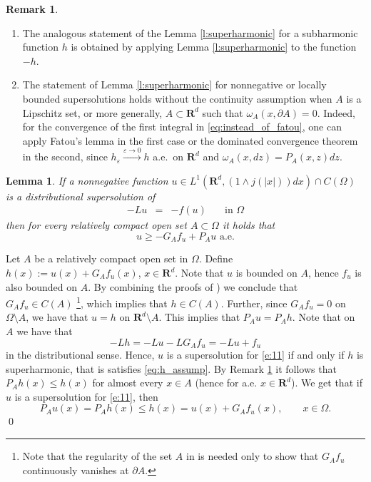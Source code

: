 \documentclass[a4paper,12pt,draft]{article}
\theoremstyle{plain}
\newtheorem{lemma}[thm]{Lemma}
\theoremstyle{definition}
\newtheorem{remark}[thm]{Remark}
\numberwithin{equation}{section}
\newcommand\R{\mathbf{R}}
\renewcommand{\le}{\leqslant}
\renewcommand{\ge}{\geqslant}
\newcommand{\1}{1}
\begin{document}
\begin{remark}\label{r:superharmonic}
\begin{enumerate}
    \item The analogous statement of the Lemma \ref{l:superharmonic} for a subharmonic function $h$ is obtained by applying Lemma \ref{l:superharmonic} to the function $-h$.
    \item The statement of Lemma \ref{l:superharmonic} for nonnegative or locally bounded supersolutions holds without the continuity assumption when $A$ is a Lipschitz set, or more generally, $A\subset\R^d$ such that $\omega_A(x,\partial A)=0$. Indeed, for the convergence of the first integral in \eqref{eq:instead_of_fatou}, one can apply Fatou's lemma in the first case or the dominated convergence theorem in the second, since $h_\varepsilon\xrightarrow{\varepsilon\to 0} h$ a.e.~on $\R^d$ and $\omega_A(x,dz)=P_A(x,z)dz$. 
\end{enumerate}
\end{remark}



\begin{lemma}\label{l:1}
If a nonnegative function $u\in L^1(\R^d, (1\wedge j(|x|))dx)\cap C(\Omega)$ is a distributional supersolution of 
\begin{equation}\label{e:11}
\begin{array}{rcll}
		-Lu&=& -f(u)& \quad \text{in } \Omega
	\end{array}
\end{equation}
then  for every relatively compact open set $A\subset \Omega$ it holds that
$$
u \ge -G_A f_u + P_A u \text{ a.e}.
$$
\end{lemma}
\proof Let $A$ be a relatively compact open set in $\Omega$. Define $h(x):=u(x)+G_A f_u (x)$, $x\in \R^d$. Note that $u$ is bounded on $A$, hence $f_u$ is also bounded on $A$. 
By combining the proofs of \cite[Lemma 2.2 and Lemma 2.4]{BVW}) we conclude that $G_A f_u \in C(A)$ \footnote{Note that the regularity of the set $A$ in \cite{BVW} is needed only to show that $G_A f_u$ continuously vanishes at $\partial A$.}, which implies that $h\in C(A)$. Further, since $G_A f_u=0$ on $\Omega\setminus A$, we have that $u=h$ on $\R^d\setminus A$. This implies that $P_A u=P_A h$.  Note that on $A$ we have that
\begin{equation*}
-Lh = -L u -L G_A f_u =-L u + f_u
\end{equation*}
in the distributional sense.  Hence, $u$ is a supersolution for \eqref{e:11} if and only if $h$ is superharmonic, that is satisfies \eqref{eq:h_assump}. By Remark \ref{r:superharmonic} it follows that $P_A h(x)\le h(x)$ for almost every $x\in A$ (hence for a.e. $x\in \R^d$). We get that if $u$ is a supersolution for \eqref{e:11}, then
\[
P_A u(x)=P_A h(x) \le h(x)=u(x)+G_A f_u (x),\qquad x\in \Omega.
\] 
\qed
\end{document}
